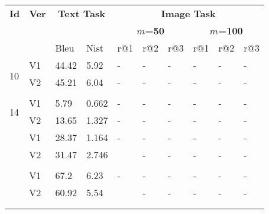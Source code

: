 \documentclass[letterpaper]{article} %
\begin{document}
\begin{table}[!ht]
\centering
{\scriptsize
\begin{tabular}{|p{0.23cm}|p{0.38cm}|p{0.45cm}|p{0.42cm}|p{0.42cm}|p{0.42cm}|p{0.42cm}|p{0.423cm}|p{0.42cm}|p{0.42cm}|}\hline
 \textbf{Id}& \textbf{Ver} & \multicolumn{2}{c|}{\textbf{Text Task}} & \multicolumn{6}{c|}{\textbf{Image Task}} \\ \cline{5-10}
  & &  \multicolumn{2}{c|}{\textbf{}} &  \multicolumn{3}{c|}{\textbf{$m$=50}} &  \multicolumn{3}{c|}{\textbf{$m$=100}} \\ \cline{3-10}
  
 & & Bleu & Nist & r@1 & r@2 & r@3 & r@1 & r@2 & r@3 \\ \hline

\multirow{3}{0.23cm}{10} 
& V1&	44.42	& 5.92		& -&	-&	-& - &	 - &	-\\ \cline{2-10}
 & V2 & 45.21 &	6.04	& 	 - &	 - &	-& - &	 - &	-\\ 
 & & & & & & & & &  \\ \hline


\multirow{2}{0.23cm}{14} 
& V1 	& 5.79 &	0.662 &	-&	-&	-& - &	 - &	-\\ \cline{2-10}
 & V2 	& 13.65 &	1.327 &	 - &	 - &	-& - &	 - &	-\\
   \Xhline{2.7\arrayrulewidth}  

\multirow{2}{0.23cm}{9}
& V1 	&28.37	&1.164 &		-	&-	&-& - &	 - &	-\\ \cline{2-10}
 & V2  & 	31.47 &	2.746 &		& - &	 - &	-& - &	-\\  
 & & & & & & & & &  \\ \Xhline{2.7\arrayrulewidth}  

\multirow{2}{0.23cm}{11} 
 & V1	& 67.2	&6.23&	-	&-&	-& - &	 - &	-\\ \cline{2-10}
  & V2  &	60.92	& 5.54 &		& - &	 - &	-& - &	-\\  
 & & & & & & & & &  \\ \Xhline{2.7\arrayrulewidth}  
 


\end{tabular}}
\end{table}
\end{document}

